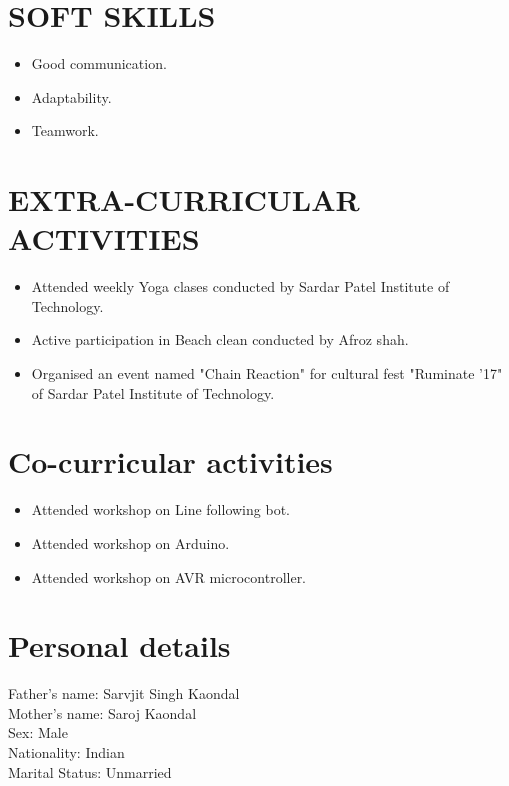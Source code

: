 \documentclass{article}
\begin{document}
\section*{\textbf{SOFT SKILLS}}
\begin{itemize}
\item Good communication.
\item Adaptability.
\item Teamwork.
\end{itemize}


\section*{\textbf{EXTRA-CURRICULAR ACTIVITIES}}
\begin{itemize}
\item Attended weekly Yoga clases conducted by Sardar Patel Institute of Technology. 
\item Active participation in Beach clean conducted by Afroz shah.
\item Organised an event named "Chain Reaction" for cultural fest "Ruminate '17" of Sardar Patel Institute of Technology.
\end{itemize}


\section*{\textbf{Co-curricular activities}}
\begin{itemize}
\item Attended workshop on Line following bot.
\item Attended workshop on Arduino.
\item Attended workshop on AVR microcontroller.
\end{itemize}


\section*{\textbf{Personal details}}
Father's name: Sarvjit Singh Kaondal\\
Mother's name: Saroj Kaondal\\
Sex: Male\\
Nationality: Indian\\
Marital Status: Unmarried
\end{document}
